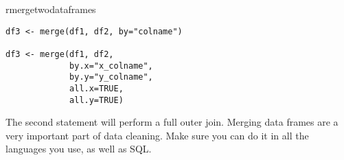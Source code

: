 \begin{answer}{rmergetwodataframes}
\begin{verbatim}
df3 <- merge(df1, df2, by="colname")

df3 <- merge(df1, df2,
             by.x="x_colname",
             by.y="y_colname",
             all.x=TRUE,
             all.y=TRUE)
\end{verbatim}
The second statement will perform a full outer join.
Merging data frames are a very important part of data cleaning.
Make sure you can do it in all the languages you use, as well as SQL.
\end{answer}
